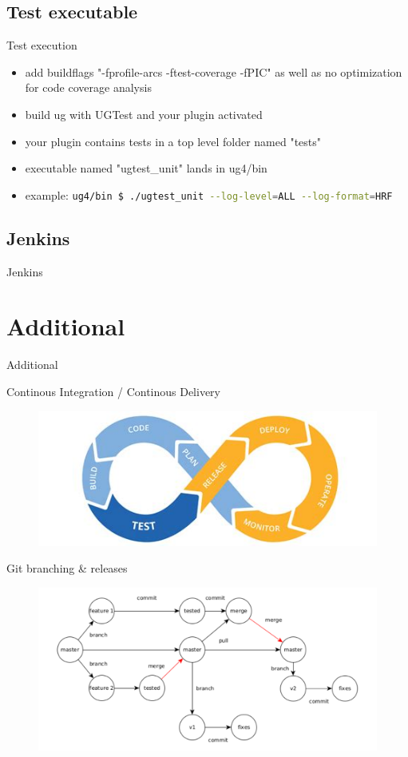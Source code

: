 \documentclass{beamer}
\newcommand{\sectiontitle}[1]{
    \section{#1}
    \begin{frame}
        \centering
        \Huge{#1}
    \end{frame}
}
\newcommand{\subsectiontitle}[1]{
    \subsection{#1}
    \begin{frame}
        \LARGE{#1}
    \end{frame}
}
\begin{document}
        \subsection{Test executable}
        \begin{frame}{Test execution}
            \begin{itemize}
                \item add buildflags "-fprofile-arcs -ftest-coverage -fPIC" as well as no optimization for code coverage analysis
                \item build ug with UGTest and your plugin activated
                \item your plugin contains tests in a top level folder named "tests"
                \item executable named "ugtest\_unit" lands in ug4/bin
                \item example: \lstinline[language=bash]{ug4/bin $ ./ugtest_unit --log-level=ALL --log-format=HRF}
            \end{itemize}
        \end{frame}
        
        \subsectiontitle{Jenkins}

    \sectiontitle{Additional}
    \begin{frame}{Continous Integration / Continous Delivery}
        \centering
        \begin{figure}
            \includegraphics[width=12cm]{./images/cicd.jpeg}
        \end{figure}
    \end{frame}

    \begin{frame}[plain]{Git branching \& releases}
        \centering
        \begin{figure}
            \includegraphics[width=12cm]{images/branching.pdf} 
        \end{figure}
    \end{frame}
   
\end{document}
